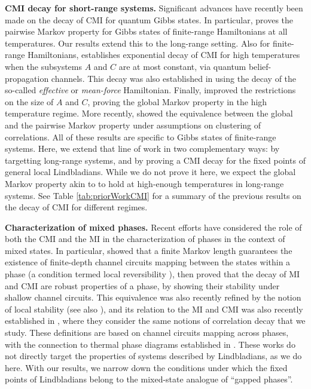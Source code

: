 \documentclass[11pt]{article}
\numberwithin{equation}{section}
\numberwithin{figure}{section}
\numberwithin{table}{section}
\theoremstyle{definition}
\theoremstyle{plain}
\theoremstyle{remark}
\begin{document}
\textbf{CMI decay for short-range systems.} Significant advances have recently been made on the decay of CMI for quantum Gibbs states. In particular, \cite{chen_quantum_2025} proves the pairwise Markov property for Gibbs states of finite-range Hamiltonians at all temperatures. Our results extend this to the long-range setting. Also for finite-range Hamiltonians, \cite{kato_clustering_2025} establishes exponential decay of CMI for high temperatures when the subsystems $A$ and $C$ are at most constant, via quantum belief-propagation channels. This decay was also established in \cite{scalet2025classicalestimationfreeenergy} using the decay of the so-called \emph{effective} or \emph{mean-force} Hamiltonian.  Finally, \cite{bakshi_dobrushin_2025} improved the restrictions on the size of $A$ and $C$, proving the global Markov property in the high temperature regime. More recently, \cite{chen2026notestrongquantummarkov} showed the equivalence between the global and the pairwise Markov property under assumptions on clustering of correlations. All of these results are specific to Gibbs states of finite-range systems. Here, we extend that line of work in two complementary ways: by targetting long-range systems, and by proving a CMI decay for the fixed points of general local Lindbladians. While we do not prove it here, we expect the global Markov property akin to \cite{bakshi_dobrushin_2025} to hold at high-enough temperatures in long-range systems. See Table \ref{tab:priorWorkCMI} for a summary of the previous results on the decay of CMI for different regimes.

\textbf{Characterization of mixed phases.} Recent efforts have considered the role of both the CMI and the MI in the characterization of phases in the context of mixed states. In particular, \cite{Sang_2025} showed that a finite Markov length guarantees the existence of finite-depth channel circuits mapping between the states within a phase  (a condition termed local reversibility \cite{sang_mixed-state_2025}), then \cite{yi2025universaldecayconditionalmutual} proved that the decay of MI and CMI are robust properties of a phase, by showing their stability under shallow channel circuits. This equivalence was also recently refined by the notion of local stability (see also \cite{cubitt_stability_2015}), and its relation to the MI and CMI was also recently established in \cite{li_unified_2026}, where they consider the same notions of correlation decay that we study. These definitions are based on channel circuits mapping across phases, with the connection to thermal phase diagrams established in \cite{ma2025circuitbasedcharacterizationfinitetemperaturequantum}. These works do not directly target the properties of systems described by Lindbladians, as we do here. With our results, we narrow down the conditions under which the fixed points of Lindbladians belong to the mixed-state analogue of ``gapped phases''.  
\end{document}
